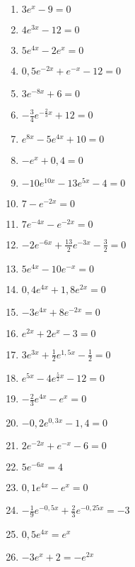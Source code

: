 \begin{Exercise}[title={Löse folgende Gleichungen}, label=eFktGlA1]

	\begin{minipage}{\textwidth}
		\begin{minipage}{0.5\textwidth}
			\begin{enumerate}[label=\alph*)]
				\item \(3e^x-9=0\)
				\item \(4e^{3x}-12=0\)
				\item \(5e^{4x}-2e^{x}=0\)
				\item \(0,5e^{-2x}+e^{-x}-12=0\)
				\item \(3e^{-8x}+6=0\)
				\item \(-\frac{3}{4}e^{-\tfrac{2}{3}x}+12=0\)
				\item \(e^{8x}-5e^{4x}+10=0\)
				\item \(-e^{x}+0,4=0\)
				\item \(-10e^{10x}-13e^{5x}-4=0\)
				\item \(7-e^{-2x}=0\)
				\item \(7e^{-4x}-e^{-2x}=0\)
				\item \(-2e^{-6x}+\frac{13}{2}e^{-3x}-\frac{3}{2}=0\)
				\item \(5e^{4x}-10e^{-x}=0\)
			\end{enumerate}
		\end{minipage}%
		\begin{minipage}{0.5\textwidth}
			\begin{enumerate}[label=\alph*)]
				\setcounter{enumi}{13}
				\item \(0,4e^{4x}+1,8e^{2x}=0\)
				\item \(-3e^{4x}+8e^{-2x}=0\)
				\item \(e^{2x}+2e^{x}-3=0\)
				\item \(3e^{3x}+\frac{1}{2}e^{1,5x}-\frac{1}{2}=0\)
				\item \(e^{5x}-4e^{\tfrac{5}{2}x}-12=0\)
				\item \(-\frac{2}{3}e^{4x}-e^{x}=0\)
				\item \(-0,2e^{0,3x}-1,4=0\)
				\item \(2e^{-2x}+e^{-x}-6=0\)
				\item \(5e^{-6x}=4\)
				\item \(0,1e^{4x}-e^{x}=0\)
				\item \(-\frac{1}{9}e^{-0,5x}+\frac{2}{3}e^{-0,25x}=-3\)
				\item \(0,5e^{4x}=e^{x}\)
				\item \(-3e^{x}+2=-e^{2x}\)
			\end{enumerate}
		\end{minipage}%
	\end{minipage}
\end{Exercise}
